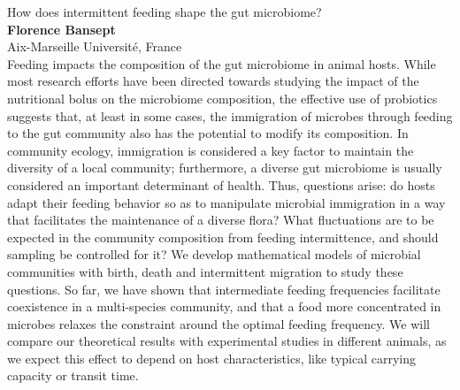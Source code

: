 \documentclass[12pt,a4paper]{article}
\begin{document}

\bigskip \bigskip  %

\noindent
{\Large How does intermittent feeding shape the gut microbiome?}\\[1ex]
{\large 
\textbf{Florence Bansept}\\[1ex] Aix-Marseille Université, France}\\[2ex]
Feeding impacts the composition of the gut microbiome in animal hosts. While most research efforts have been directed towards studying the impact of the nutritional bolus on the microbiome composition, the effective use of probiotics suggests that, at least in some cases, the immigration of microbes through feeding to the gut community also has the potential to modify its composition. In community ecology, immigration is considered a key factor to maintain the diversity of a local community; furthermore, a diverse gut microbiome is usually considered an important determinant of health. Thus, questions arise: do hosts adapt their feeding behavior so as to manipulate microbial immigration in a way that facilitates the maintenance of a diverse flora? What fluctuations are to be expected in the community composition from feeding intermittence, and should sampling be controlled for it? We develop mathematical models of microbial communities with birth, death and intermittent migration to study these questions. So far, we have shown that intermediate feeding frequencies facilitate coexistence in a multi-species community, and that a food more concentrated in microbes relaxes the constraint around the optimal feeding frequency. We will compare our theoretical results with experimental studies in different animals, as we expect this effect to depend on host characteristics, like typical carrying capacity or transit time. 
\end{document}
